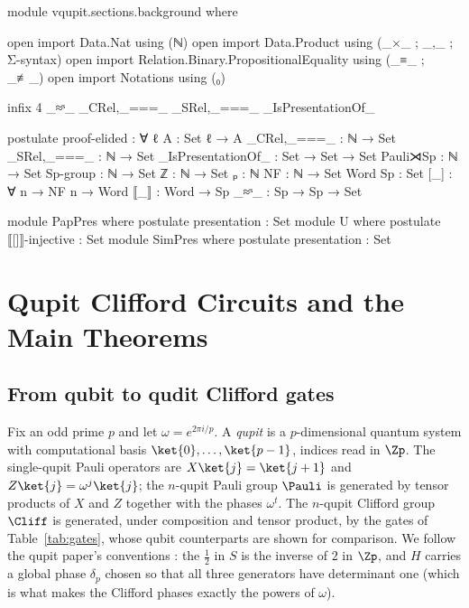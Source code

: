 \begin{code}[hide]
module vqupit.sections.background where

open import Data.Nat using (ℕ)
open import Data.Product using (_×_ ; _,_ ; Σ-syntax)
open import Relation.Binary.PropositionalEquality using (_≡_ ; _≢_)
open import Notations using (₀)

infix 4 _≈ˢ_ _CRel,_===_ _SRel,_===_ _IsPresentationOf_

postulate
  proof-elided : ∀ {ℓ} {A : Set ℓ} → A
  _CRel,_===_ : ℕ → Set
  _SRel,_===_ : ℕ → Set
  _IsPresentationOf_ : Set → Set → Set
  Pauli⋊Sp : ℕ → Set
  Sp-group : ℕ → Set
  ℤ : ℕ → Set
  ₚ : ℕ
  NF : ℕ → Set
  Word Sp : Set
  [_] : ∀ {n} → NF n → Word
  ⟦_⟧ : Word → Sp
  _≈ˢ_ : Sp → Sp → Set

module PapPres where
  postulate presentation : Set
module U where
  postulate ⟦[]⟧-injective : Set
module SimPres where
  postulate presentation : Set
\end{code}
\section{Qupit Clifford Circuits and the Main Theorems}\label{sec:background}

\subsection{From qubit to qudit Clifford gates}

Fix an odd prime $p$ and let $\omega = e^{2\pi i/p}$.  A \emph{qupit} is
a $p$-dimensional quantum system with computational basis
$\ket{0},\dots,\ket{p-1}$, indices read in $\Zp$.  The single-qupit Pauli
operators are $X\ket{j} = \ket{j+1}$ and $Z\ket{j} = \omega^{j}\ket{j}$;
the $n$-qupit Pauli group $\Pauli$ is generated by tensor products of $X$
and $Z$ together with the phases $\omega^t$.  The $n$-qupit Clifford
group $\Cliff$ is generated, under composition and tensor product, by the
gates of Table~\ref{tab:gates}, whose qubit counterparts are shown for
comparison.  We follow the qupit paper's conventions
\cite{bian2026qudit}: the $\tfrac12$ in $S$ is the inverse of $2$ in
$\Zp$, and $H$ carries a global phase $\delta_p$ chosen so that all three
generators have determinant one (which is what makes the Clifford phases
exactly the powers of $\omega$).

